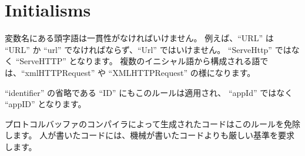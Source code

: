 \section{Initialisms}

変数名にある頭字語は一貫性がなければいけません。 例えば、“URL” は “URL” か “url” でなければならず、“Url” ではいけません。 “ServeHttp” ではなく “ServeHTTP” となります。 複数のイニシャル語から構成される語では、“xmlHTTPRequest” や “XMLHTTPRequest” の様になります。

“identifier” の省略である “ID” にもこのルールは適用され、 “appId” ではなく “appID” となります。

プロトコルバッファのコンパイラによって生成されたコードはこのルールを免除します。 人が書いたコードには、機械が書いたコードよりも厳しい基準を要求します。

